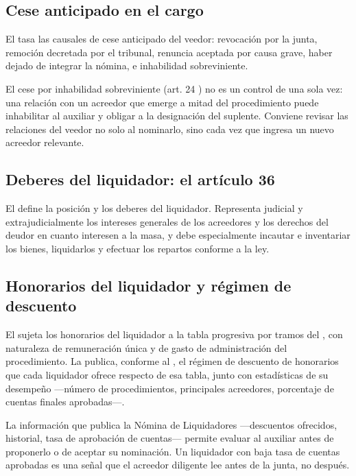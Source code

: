 \subsection{Cese anticipado en el cargo}

El  tasa las causales de cese anticipado del veedor: revocación por la junta, remoción
decretada por el tribunal, renuncia aceptada por causa grave, haber dejado de integrar la
nómina, e inhabilidad sobreviniente.

\begin{practica}
El cese por inhabilidad sobreviniente (art. 24 ) no es un control de una sola vez: una
relación con un acreedor que emerge a mitad del procedimiento puede inhabilitar al auxiliar y
obligar a la designación del suplente. Conviene revisar las relaciones del veedor no solo al
nominarlo, sino cada vez que ingresa un nuevo acreedor relevante.
\end{practica}

\subsection{Deberes del liquidador: el artículo 36}

El  define la posición y los deberes del liquidador. Representa judicial y
extrajudicialmente los intereses generales de los acreedores y los derechos del deudor en
cuanto interesen a la masa, y debe especialmente incautar e inventariar los bienes,
liquidarlos y efectuar los repartos conforme a la ley.

\subsection{Honorarios del liquidador y régimen de descuento}

El  sujeta los honorarios del liquidador a la tabla progresiva por tramos del ,
con naturaleza de remuneración única y de gasto de administración del procedimiento. La
 publica, conforme al , el régimen de descuento de
honorarios que cada liquidador ofrece respecto de esa tabla, junto con estadísticas de su
desempeño ---número de procedimientos, principales acreedores, porcentaje de cuentas finales
aprobadas---.

\begin{foco}
La información que publica la Nómina de Liquidadores ---descuentos ofrecidos, historial,
tasa de aprobación de cuentas--- permite evaluar al auxiliar antes de proponerlo o de
aceptar su nominación. Un liquidador con baja tasa de cuentas aprobadas es una señal que el
acreedor diligente lee antes de la junta, no después.
\end{foco}

